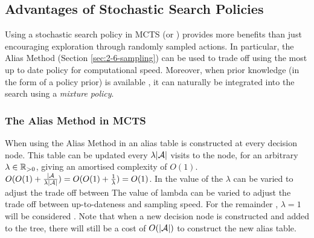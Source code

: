 








    \subsection{Advantages of Stochastic Search Policies}
    \label{sec:4-2-3-stoch_search_policies}

        Using a stochastic search policy in MCTS (or \thtspp) provides more benefits than just encouraging exploration through randomly sampled actions. In particular, the Alias Method (Section \ref{sec:2-6-sampling}) can be used to trade off using the most up to date policy for computational speed. Moreover, when prior knowledge (in the form of a policy prior) is available , it can naturally be integrated into the search using a \textit{mixture policy}.

         \complexityq






        \subsubsection{The Alias Method in MCTS}


        When using the Alias Method in \thtspp\ewe an alias table  is constructed at every decision node. This table can be updated every $\lambda|\mathcal{A}|$ visits to the node, for an arbitrary $\lambda\in\mathbb{R}_{>0}$, giving an amortised complexity of $O(1)$.  $O(O(1)+\frac{|\mathcal{A}}{\lambda|\mathcal{A}|}) = O(O(1)+\frac{1}{\lambda}) = O(1)$.  In \thtspp the value of the $\lambda$ can be varied to adjust the trade off between The value of lambda can be varied to adjust the trade off between up-to-dateness and sampling speed. For the remainder , $\lambda=1$ will be considered . Note that when a new decision node is constructed and added to the tree, there will still be a cost of $O(|\mathcal{A}|)$ to construct the new alias table.
        
